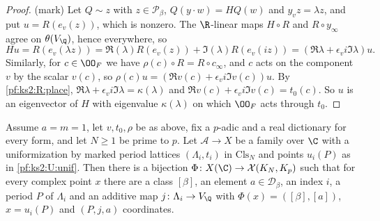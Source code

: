 \begin{proof}
(mark) Let $Q\sim z$ with $z\in\mathcal P_\beta$, $Q(y\cdot w)=HQ(w)$ and $y_vz=\lambda z$, and put
$u=R(e_v(z))$, which is nonzero. The $\R$-linear maps $H\circ R$ and $R\circ y_\infty$ agree on
$\theta(V_\Q)$, hence everywhere, so
\[
Hu=R(e_v(\lambda z))=\Re(\lambda)R(e_v(z))+\Im(\lambda)R(e_v(iz))=(\Re\lambda+\epsilon_vi\Im\lambda)u .
\]
Similarly, for $c\in\kstwoOF$ we have $\rho(c)\circ R=R\circ c_\infty$, and $c$ acts on the component
$v$ by the scalar $v(c)$, so $\rho(c)u=(\Re v(c)+\epsilon_vi\Im v(c))u$. By \ref{pf:ks2:R:place},
$\Re\lambda+\epsilon_vi\Im\lambda=\kappa(\lambda)$ and $\Re v(c)+\epsilon_vi\Im v(c)=t_0(c)$. So $u$
is an eigenvector of $H$ with eigenvalue $\kappa(\lambda)$ on which $\kstwoOF$ acts through $t_0$.
\end{proof}

\begin{proposition}\label{pf:ks2:unifg}
Assume $a=m=1$, let $v,t_0,\rho$ be as above, fix a $p$-adic and a real dictionary for every form, and
let $N\ge1$ be prime to $p$. Let $\mathcal A\to X$ be a family over $\C$ with a uniformization by
marked period lattices $(\Lambda_i,t_i)$ in $\mathrm{Cls}_N$ and points $u_i(P)$ as in
\ref{pf:ks2:U:unif}. Then there is a bijection $\Phi\colon X(\C)\to\mathcal X(K_N,\kstwoKp)$ such that
for every complex point $x$ there are a class $[\beta]$, an element $a\in\mathcal D_\beta$, an index
$i$, a period $P$ of $\Lambda_i$ and an additive map $j\colon\Lambda_i\to V_\Q$ with
$\Phi(x)=([\beta],[a])$, $x=u_i(P)$ and $(P,j,a)$ coordinates.
\end{proposition}

